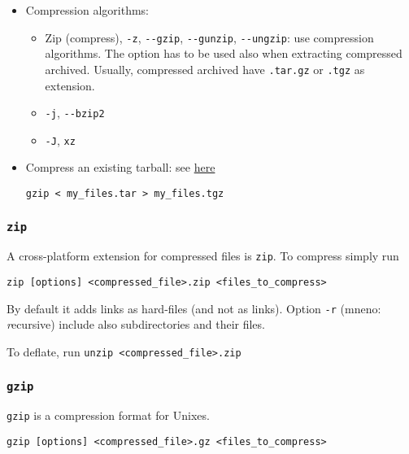 \documentclass[a4paper,12pt,%
              final%
              ]{article}
\begin{document}
\begin{itemize}
\begin{itemize}
    \end{itemize}
  \item Compression algorithms:
    \begin{itemize}
      \item Zip (compress), \verb|-z|, \verb|--gzip|, \verb|--gunzip|, \verb|--ungzip|: use compression algorithms. The option has to be used also when extracting compressed archived. Usually, compressed archived have \verb|.tar.gz| or \verb|.tgz| as extension.
      \item \verb|-j|, \verb|--bzip2|
      \item \verb|-J|, \verb|xz|
    \end{itemize}
  \item Compress an existing tarball: see \href{https://unix.stackexchange.com/questions/457949/how-to-turn-a-tar-file-to-a-tgz-file}{here}
\begin{verbatim}
gzip < my_files.tar > my_files.tgz
\end{verbatim}
\end{itemize}

\subsubsection{\texttt{zip}}
A cross-platform extension for compressed files is \texttt{zip}. To compress simply run
\begin{verbatim}
zip [options] <compressed_file>.zip <files_to_compress>
\end{verbatim}
By default it adds links as hard-files (and not as links). Option \verb|-r| (mneno: \emph{r}ecursive) include also {sub}directories and their files.

To deflate, run \verb|unzip <compressed_file>.zip|

\subsubsection{\texttt{gzip}}
\texttt{gzip} is a compression format for Unixes.
\begin{verbatim}
gzip [options] <compressed_file>.gz <files_to_compress>
\end{verbatim}

\end{document}
